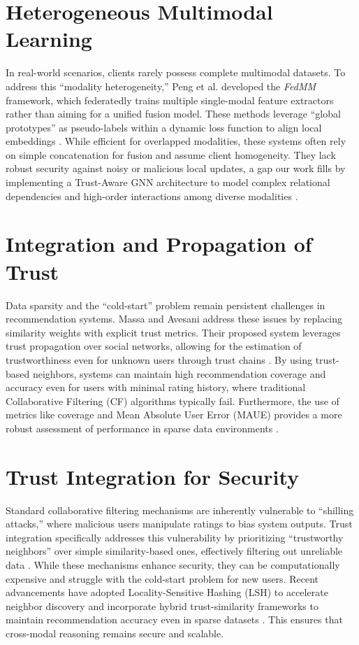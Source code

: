 \documentclass[12pt,a4paper]{report}
\begin{document}
{\section{Heterogeneous Multimodal Learning}
In real-world scenarios, clients rarely possess complete multimodal datasets. To address this ``modality heterogeneity,'' Peng et al. \cite{b2} developed the \textit{FedMM} framework, which federatedly trains multiple single-modal feature extractors rather than aiming for a unified fusion model. These methods leverage ``global prototypes'' as pseudo-labels within a dynamic loss function to align local embeddings \cite{b2}. While efficient for overlapped modalities, these systems often rely on simple concatenation for fusion and assume client homogeneity. They lack robust security against noisy or malicious local updates, a gap our work fills by implementing a Trust-Aware GNN architecture to model complex relational dependencies and high-order interactions among diverse modalities \cite{b2}.

\section{Integration and Propagation of Trust}
Data sparsity and the ``cold-start'' problem remain persistent challenges in recommendation systems. Massa and Avesani \cite{b3} address these issues by replacing similarity weights with explicit trust metrics. Their proposed system leverages trust propagation over social networks, allowing for the estimation of trustworthiness even for unknown users through trust chains \cite{b3}. By using trust-based neighbors, systems can maintain high recommendation coverage and accuracy even for users with minimal rating history, where traditional Collaborative Filtering (CF) algorithms typically fail. Furthermore, the use of metrics like coverage and Mean Absolute User Error (MAUE) provides a more robust assessment of performance in sparse data environments \cite{b3}.

\section{Trust Integration for Security}
Standard collaborative filtering mechanisms are inherently vulnerable to ``shilling attacks,'' where malicious users manipulate ratings to bias system outputs. Trust integration specifically addresses this vulnerability by prioritizing ``trustworthy neighbors'' over simple similarity-based ones, effectively filtering out unreliable data \cite{b4}. While these mechanisms enhance security, they can be computationally expensive and struggle with the cold-start problem for new users. Recent advancements have adopted Locality-Sensitive Hashing (LSH) to accelerate neighbor discovery and incorporate hybrid trust-similarity frameworks to maintain recommendation accuracy even in sparse datasets \cite{b4}. This ensures that cross-modal reasoning remains secure and scalable.

}
\end{document}
